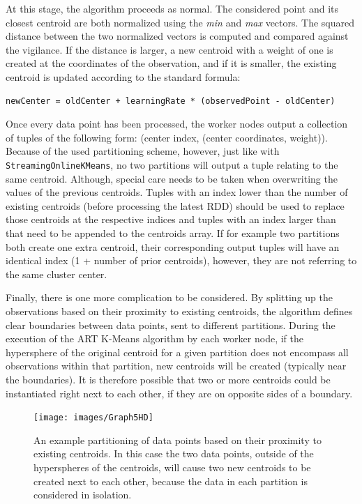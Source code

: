 \documentclass{l4proj}
\begin{document}
At this stage, the algorithm proceeds as normal. The considered point and its closest centroid are both normalized using the \textit{min} and \textit{max} vectors. The squared distance between the two normalized vectors is computed and compared against the vigilance. If the distance is larger, a new centroid with a weight of one is created at the coordinates of the observation, and if it is smaller, the existing centroid is updated according to the standard formula:

\begin{center}
\begin{BVerbatim}
newCenter = oldCenter + learningRate * (observedPoint - oldCenter)
\end{BVerbatim}
\end{center}

Once every data point has been processed, the worker nodes output a collection of tuples of the following form: (center index, (center coordinates, weight)). Because of the used partitioning scheme, however, just like with \texttt{StreamingOnlineKMeans}, no two partitions will output a tuple relating to the same centroid. Although, special care needs to be taken when overwriting the values of the previous centroids. Tuples with an index lower than the number of existing centroids (before processing the latest RDD) should be used to replace those centroids at the respective indices and tuples with an index larger than that need to be appended to the centroids array. If for example two partitions both create one extra centroid, their corresponding output tuples will have an identical index (1 + number of prior centroids), however, they are not referring to the same cluster center.

Finally, there is one more complication to be considered. By splitting up the observations based on their proximity to existing centroids, the algorithm defines clear boundaries between data points, sent to different partitions. During the execution of the ART K-Means algorithm by each worker node, if the hypersphere of the original centroid for a given partition does not encompass all observations within that partition, new centroids will be created (typically near the boundaries). It is therefore possible that two or more centroids could be instantiated right next to each other, if they are on opposite sides of a boundary.

\begin{figure}[H]
	\centering
    \label{grapgh-boundary}
    \texttt{[image: images/Graph5HD]}
    \caption{An example partitioning of data points based on their proximity to existing centroids. In this case the two data points, outside of the hyperspheres of the centroids, will cause two new centroids to be created next to each other, because the data in each partition is considered in isolation.} 
\end{figure}
\end{document}

